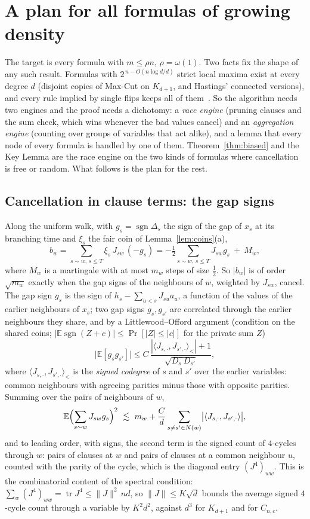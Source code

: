\documentclass[11pt,a4paper]{article}
\theoremstyle{definition}
\theoremstyle{remark}
\newcommand{\E}{\mathbb{E}}
\newcommand{\sgn}{\operatorname{sgn}}
\begin{document}
\section{A plan for all formulas of growing density}\label{sec:plan}

The target is every formula with $m\le\rho n$, $\rho=\omega(1)$. Two facts fix
the shape of any such result. Formulas with $2^{\,n-O(n\log d/d)}$ strict local
maxima exist at every degree $d$ (disjoint copies of Max-Cut on $K_{d+1}$, and
Hastings' connected versions), and every rule implied by single flips keeps all
of them~\cite[Section~9]{N4}. So the algorithm needs two engines and the proof
needs a dichotomy: a \emph{race engine} (pruning clauses and the sum check,
which wins whenever the bad values cancel) and an \emph{aggregation engine}
(counting over groups of variables that act alike), and a lemma that every
node of every formula is handled by one of them. Theorem~\ref{thm:biased} and
the Key Lemma are the race engine on the two kinds of formulas where
cancellation is free or random. What follows is the plan for the rest.

\subsection{Cancellation in clause terms: the gap signs}

Along the uniform walk, with $g_s=\sgn\Delta_s$ the sign of the gap of $x_s$ at
its branching time and $\xi_s$ the fair coin of Lemma~\ref{lem:coins}(a),
\[
 b_w=\sum_{s\sim w,\,s\le T}\xi_s\,J_{sw}\,(-g_s)
 =-\tfrac12\sum_{s\sim w,\,s\le T}J_{sw}g_s\ +\ M_w ,
\]
where $M_w$ is a martingale with at most $m_w$ steps of size $\frac12$. So
$|b_w|$ is of order $\sqrt{m_w}$ exactly when the gap signs of the neighbours
of $w$, weighted by $J_{sw}$, cancel. The gap sign $g_s$ is the sign of
$h_s-\sum_{u<s}J_{su}a_u$, a function of the values of the earlier neighbours
of $x_s$; two gap signs $g_s,g_{s'}$ are correlated through the earlier
neighbours they share, and by a Littlewood--Offord argument
(condition on the shared coins; $|\E\sgn(Z+c)|\le\Pr[|Z|\le|c|]$ for the
private sum $Z$)
\[
 \bigl|\E[g_sg_{s'}]\bigr|\le C\,\frac{|\langle J_{s,\cdot},J_{s',\cdot}\rangle_{<}|+1}
 {\sqrt{D^-_sD^-_{s'}}},
\]
where $\langle J_{s,\cdot},J_{s',\cdot}\rangle_<$ is the \emph{signed codegree}
of $s$ and $s'$ over the earlier variables: common neighbours with agreeing
parities minus those with opposite parities. Summing over the pairs of
neighbours of $w$,
\[
 \E\Bigl(\sum_{s\sim w}J_{sw}g_s\Bigr)^2\ \lesssim\ m_w+\frac{C}{d}
 \sum_{s\ne s'\in N(w)}\bigl|\langle J_{s,\cdot},J_{s',\cdot}\rangle\bigr| ,
\]
and to leading order, with signs, the second term is the signed count of
$4$-cycles through $w$: pairs of clauses at $w$ and pairs of clauses at a
common neighbour $u$, counted with the parity of the cycle, which is the
diagonal entry $(J^4)_{ww}$. This is the combinatorial content of the spectral
condition: $\sum_w(J^4)_{ww}=\operatorname{tr}J^4\le\|J\|^2\,nd$, so
$\|J\|\le K\sqrt d$ bounds the average signed $4$-cycle count through a
variable by $K^2d^2$, against $d^3$ for $K_{d+1}$ and for $C_{n,c}$.
\end{document}
